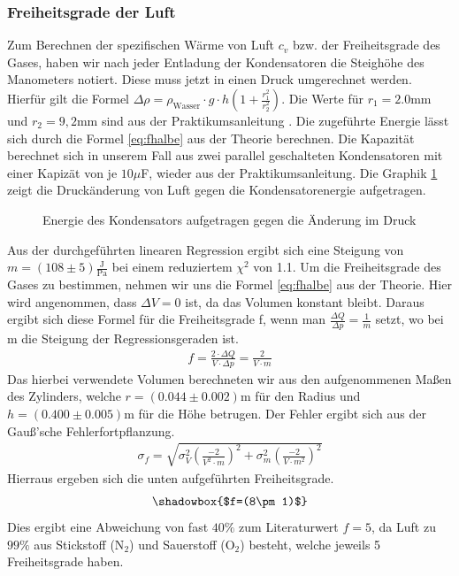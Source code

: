 \documentclass[12pt,a4paper,titlepage,headinclude,bibtotoc]{scrartcl}
\begin{document}
\subsubsection{Freiheitsgrade der Luft}
Zum Berechnen der spezifischen Wärme von Luft $c_v$ bzw. der Freiheitsgrade des Gases, haben wir nach jeder Entladung der Kondensatoren die Steighöhe des Manometers notiert.
Diese muss jetzt in einen Druck umgerechnet werden.
Hierfür gilt die Formel $\Delta \rho = \rho_\text{Wasser} \cdot g \cdot h\left(1+\frac{r_1^2}{r_2^2}\right)$.
Die Werte für $r_1=2.0$mm und $r_2=9,2$mm sind aus der Praktikumsanleitung \cite[S. 73]{prakti}.
Die zugeführte Energie lässt sich durch die Formel \ref{eq:fhalbe} aus der Theorie berechnen.
Die Kapazität berechnet sich in unserem Fall aus zwei parallel geschalteten Kondensatoren mit einer Kapizät von je $10\mu$F, wieder aus der Praktikumsanleitung.
Die Graphik \ref{fig:druckwarm} zeigt die Druckänderung von Luft gegen die Kondensatorenergie aufgetragen.
\begin{figure}[!h]
\centering

\caption{Energie des Kondensators aufgetragen gegen die Änderung im Druck}
\label{fig:druckwarm}
\end{figure}
Aus der durchgeführten linearen Regression ergibt sich eine Steigung von $m=(108\pm5)\frac{\text{J}}{\text{Pa}}$
bei einem reduziertem $\chi^2$ von 1.1.
Um die Freiheitsgrade des Gases zu bestimmen, nehmen wir uns die Formel \eqref{eq:fhalbe}
aus der Theorie.
Hier wird angenommen, dass $\Delta V=0$ ist, da das Volumen konstant bleibt.
Daraus ergibt sich diese Formel für die Freiheitsgrade f, wenn man $\frac{\Delta Q}{\Delta p}=\frac1m$ setzt, wo bei m die Steigung der Regressionsgeraden ist.
\begin{align}
	f= \frac{2\cdot \Delta Q}{V\cdot \Delta p}=\frac{2}{V\cdot m}
\end{align}
Das hierbei verwendete Volumen berechneten wir aus den aufgenommenen Maßen des Zylinders, welche $r=(0.044\pm 0.002)$m für den Radius und $h=(0.400\pm 0.005)$m für die Höhe betrugen.
Der Fehler ergibt sich aus der Gauß'sche Fehlerfortpflanzung.
\begin{align}
	\sigma_f=\sqrt{\sigma_V^2\left(\frac{-2}{V^2\cdot m}\right)^2+\sigma_m^2\left(\frac{-2}{V\cdot m^2}\right)^2}
\end{align}
Hierraus ergeben sich die unten aufgeführten Freiheitsgrade.
$$\shadowbox{$f=(8\pm 1)$}$$
Dies ergibt eine Abweichung von fast $40\%$ zum Literaturwert $f=5$, da Luft zu $99\%$ aus Stickstoff (N$_2$) und Sauerstoff (O$_2$) besteht, welche jeweils 5 Freiheitsgrade haben.
\end{document}

